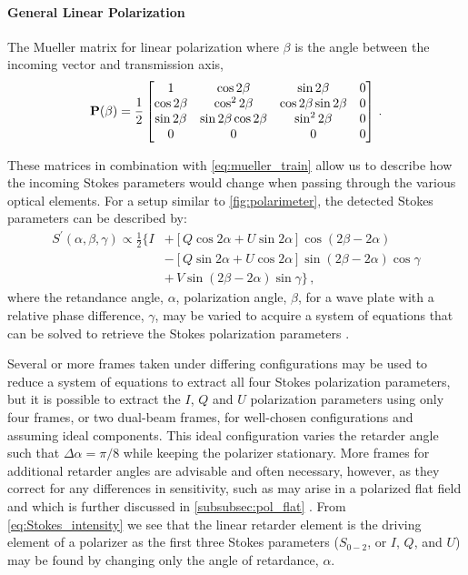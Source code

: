 \paragraph{General Linear Polarization}
The Mueller matrix for linear polarization where $\beta$ is the angle between the incoming vector and transmission axis,
\begin{equation} \label{matrix:polarizer}
    \mathbf{P}(\beta) = \frac{1}{2}
    \begin{bmatrix}
        1            & \cos 2 \beta              & \sin 2 \beta              & 0 \\
        \cos 2 \beta & \cos^{2} 2 \beta          & \cos 2 \beta \sin 2 \beta & 0 \\
        \sin 2 \beta & \sin 2 \beta \cos 2 \beta & \sin^{2} 2 \beta          & 0 \\
        0            & 0                         & 0                         & 0 \\
    \end{bmatrix}\,.
\end{equation}

These matrices in combination with \autoref{eq:mueller_train} allow us to describe how the incoming Stokes parameters would change when passing through the various optical elements. For a setup similar to \autoref{fig:polarimeter}, the detected Stokes parameters can be described by:
\begin{equation} \label{eq:Stokes_intensity}
    \begin{split}
        S^{\prime}(\alpha, \beta, \gamma) \propto \frac{1}{2} \{ I & + [Q \cos2\alpha + U \sin2\alpha] \cos(2\beta - 2\alpha) \\
        & - [Q \sin2\alpha + U \cos2\alpha] \sin(2\beta - 2\alpha) \cos\gamma\\
        & + \,V \sin(2\beta - 2\alpha)\sin\gamma \}\,,
    \end{split}
\end{equation}
where the retandance angle, $\alpha$, polarization angle, $\beta$, for a wave plate with a relative phase difference, $\gamma$, may be varied to acquire a system of equations that can be solved to retrieve the Stokes polarization parameters \citep{waveplate_in_specpol}.

Several or more frames taken under differing configurations may be used to reduce a system of equations to extract all four Stokes polarization parameters, but it is possible to extract the $I$, $Q$ and $U$ polarization parameters using only four frames, or two dual-beam frames, for well-chosen configurations and assuming ideal components. This ideal configuration varies the retarder angle such that $\Delta\alpha = \pi / 8$ while keeping the polarizer stationary. More frames for additional retarder angles are advisable and often necessary, however, as they correct for any differences in sensitivity, such as may arise in a polarized flat field and which is further discussed in \autoref{subsubsec:pol_flat} \citep{polarimetry_error}. From \autoref{eq:Stokes_intensity} we see that the linear retarder element is the driving element of a polarizer as the first three Stokes parameters ($S_{0-2}$, or $I$, $Q$, and $U$) may be found by changing only the angle of retardance, $\alpha$.

